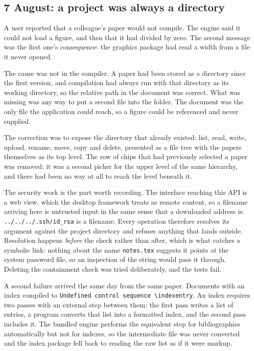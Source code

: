 \documentclass[11pt,a4paper]{article}
\begin{document}
\subsection{7 August: a project was always a directory}

A user reported that a colleague's paper would not compile. The engine said it
could not load a figure, and then that it had divided by zero. The second
message was the first one's consequence: the graphics package had read a width
from a file it never opened.

The cause was not in the compiler. A paper had been stored as a directory since
the first version, and compilation had always run with that directory as its
working directory, so the relative path in the document was correct. What was
missing was any way to put a second file into the folder. The document was the
only file the application could reach, so a figure could be referenced and never
supplied.

The correction was to expose the directory that already existed: list, read,
write, upload, rename, move, copy and delete, presented as a file tree with the
papers themselves as its top level. The row of chips that had previously
selected a paper was removed: it was a second picker for the upper level of
the same hierarchy, and there had been no way at all to reach the level beneath
it.

The security work is the part worth recording. The interface reaching this API
is a web view, which the desktop framework treats as remote content, so a
filename arriving here is untrusted input in the same sense that a downloaded
address is: \texttt{../../../.ssh/id\_rsa} is a filename. Every operation
therefore resolves its argument against the project directory and refuses
anything that lands outside. Resolution happens \emph{before} the check rather
than after, which is what catches a symbolic link: nothing about the name
\texttt{notes.tex} suggests it points at the system password file, so an
inspection of the string would pass it through. Deleting the containment check
was tried deliberately, and the tests fail.

A second failure arrived the same day from the same paper. Documents with an
index compiled to \texttt{Undefined control sequence \textbackslash indexentry}.
An index requires two passes with an external step between them: the first pass
writes a list of entries, a program converts that list into a formatted index,
and the second pass includes it. The bundled engine performs the equivalent step
for bibliographies automatically but not for indexes, so the intermediate file
was never converted and the index package fell back to reading the raw list as
if it were markup.
\end{document}

